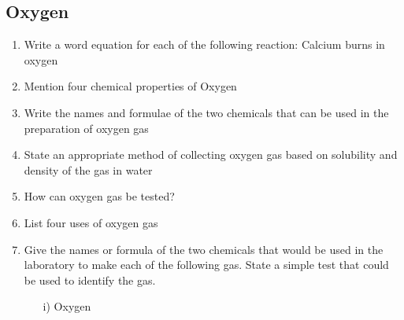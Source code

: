 \subsection{Oxygen}

\begin{enumerate}
	\item Write a word equation for each of the following reaction: Calcium burns in oxygen
	
	\item Mention four chemical properties of Oxygen
	
	\item Write the names and formulae of the two chemicals that can be used in the preparation of oxygen gas
	
	\item State an appropriate method of collecting oxygen gas based on solubility and density of the gas in water
	
	\item How can oxygen gas be tested?
	
	\item List four uses of oxygen gas

	\item Give the names or formula of the two chemicals that would be used in the laboratory to make each of the following gas. State a simple test that could be used to identify the gas. 
	\begin{enumerate}
		\item[i)] Oxygen
	\end{enumerate}
\end{enumerate}













